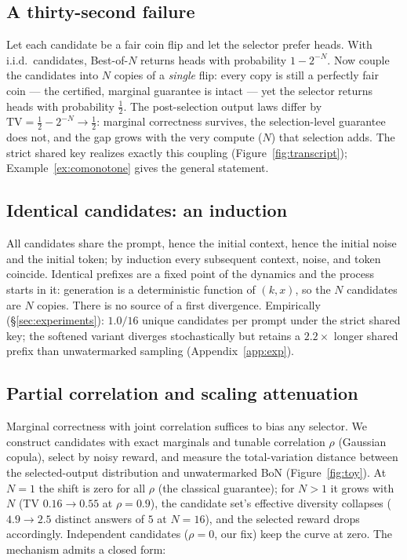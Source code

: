 \documentclass{article} %
\begin{document}
\subsection{A thirty-second failure}\label{sec:coin}
Let each candidate be a fair coin flip and let the selector prefer heads. With
i.i.d.\ candidates, Best-of-$N$ returns heads with probability $1-2^{-N}$. Now
couple the candidates into $N$ copies of a \emph{single} flip: every copy is
still a perfectly fair coin --- the certified, marginal guarantee is intact ---
yet the selector returns heads with probability $\tfrac12$. The
post-selection output laws differ by $\mathrm{TV}=\tfrac12-2^{-N}\to\tfrac12$: marginal
correctness survives, the selection-level guarantee does not, and the gap
grows with
the very compute ($N$) that selection adds. The strict shared key realizes
exactly this coupling (Figure~\ref{fig:transcript});
Example~\ref{ex:comonotone} gives the general statement.

\subsection{Identical candidates: an induction}
All candidates share the prompt, hence the initial context, hence the initial noise
and the initial token; by induction every subsequent context, noise, and token
coincide. Identical prefixes are a fixed point of the dynamics and the process
starts in it: generation is a deterministic function of $(k,x)$, so the $N$
candidates are $N$ copies. There is no source of a first divergence.
Empirically (\S\ref{sec:experiments}): $1.0/16$ unique candidates per prompt under
the strict shared key; the softened variant diverges stochastically but retains a
$2.2\times$ longer shared prefix than unwatermarked sampling
(Appendix~\ref{app:exp}).

\subsection{Partial correlation and scaling attenuation}\label{sec:toy}
Marginal correctness with joint correlation suffices to bias any selector.
We construct candidates with exact marginals and tunable correlation $\rho$
(Gaussian copula), select by noisy reward, and measure the total-variation
distance between the selected-output distribution and unwatermarked BoN
(Figure~\ref{fig:toy}). At $N{=}1$ the shift is zero for all $\rho$ (the classical
guarantee); for $N>1$ it grows with $N$ (TV $0.16\to0.55$ at $\rho{=}0.9$),
the candidate set's effective diversity collapses ($4.9\to2.5$ distinct answers
of $5$ at $N{=}16$), and the selected reward drops accordingly. Independent
candidates ($\rho{=}0$, our fix) keep the curve at zero.
The mechanism admits a closed form:
\end{document}
